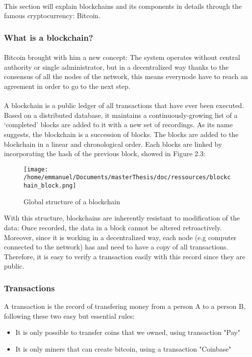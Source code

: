 \paragraph{}
This section will explain blockchains and its components in details through the famous cryptocurrency: Bitcoin.

\subsubsection{What is a blockchain?}
\paragraph{}
Bitcoin brought with him a new concept: The system operates without central authority or single administrator, but in a decentralized way thanks to the consensus of all the nodes of the network, this means everynode have to reach an agreement in order to go to the next step. 
\paragraph{}
A blockchain is a public ledger of all transactions that have ever been executed. Based on a distributed database, it maintains a continuously-growing list of a ‘completed’ blocks are added to it with a new set of recordings. As its name suggests, the blockchain is a succession of blocks. The blocks are added to the blockchain in a linear and chronological order. Each blocks are linked by incorporating the hash of the previous block, showed in Figure 2.3:
\begin{figure}[htp]
\centering
\texttt{[image: /home/emmanuel/Documents/masterThesis/doc/ressources/blockchain\_block.png]}
\caption{Global structure of a blockchain}
\label{}
\end{figure}
\newline
With this structure, blockchains are inherently resistant to modification of the data: Once recorded, the data in a block cannot be altered retroactively. Moreover, since it is working in a decentralized way, each node (e.g computer connected to the network) has and need to have a copy of all transactions. Therefore, it is easy to verify a transaction easily with this record since they are public.

\subsubsection{Transactions}
A transaction is the record of transfering money from a person A to a person B, following these two easy but essential rules: 
\begin{itemize}
  \setlength\itemsep{0em}

  \item It is only possible to transfer coins that we owned, using transaction "Pay"
  \item It is only miners that can create bitcoin, using a transaction "Coinbase"
\end{itemize}


